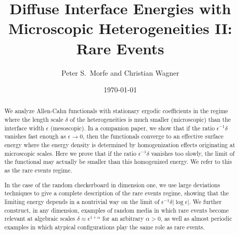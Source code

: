 \documentclass[12pt]{amsart}
\begin{document}
\title[Phase Transitions with Microscopic Heterogeneities]{Diffuse Interface Energies with Microscopic Heterogeneities II: Rare Events}
\author[P.S.\ Morfe and C.\ Wagner]{Peter S.\ Morfe and Christian Wagner}
\address{%
  Pennsylvania State University, 219B McAllister Building, University Park, State College, PA 16802
}
\address{%
	Institute for Science and Technology Austria (ISTA), Am Campus 1, 3400 {Kloster\-neu\-burg}, Austria
}

\begin{abstract} We analyze Allen-Cahn functionals with stationary ergodic coefficients in the regime where the length scale $\delta$ of the heterogeneities is much smaller (microscopic) than the interface width $\epsilon$ (mesoscopic).  In a companion paper, we show that if the ratio $\epsilon^{-1} \delta$ vanishes fast enough as $\epsilon \to 0$, then the functionals converge to an effective surface energy where the energy density is determined by homogenization effects originating at microscopic scales.  Here we prove that if the ratio $\epsilon^{-1} \delta $ vanishes too slowly, the limit of the functional may actually be smaller than this homogenized energy. We refer to this as the rare events regime.  

In the case of the random checkerboard in dimension one, we use large deviations techniques to give a complete description of the rare events regime,  showing that the limiting energy depends in a nontrivial way on the limit of $\epsilon^{-1} \delta | \log \epsilon |$.  We further construct, in any dimension, examples of random media in which rare events become relevant at algebraic scales $\delta \approx \epsilon^{1 + \alpha}$ for an arbitrary $\alpha > 0$, as well as almost periodic examples in which atypical configurations play the same role as rare events.
\end{abstract}

\date{\today}

\maketitle
\end{document}
